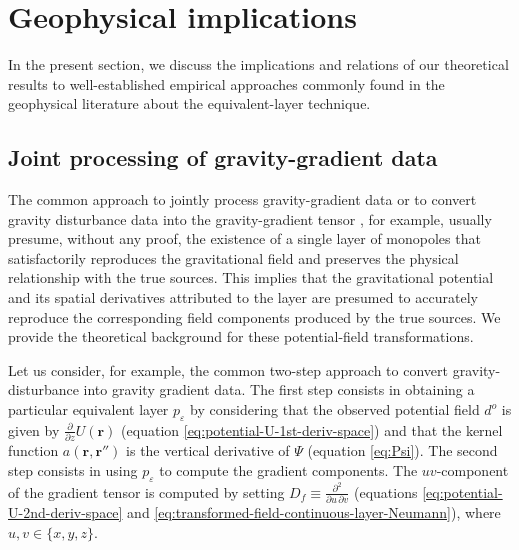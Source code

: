 \section{Geophysical implications}

In the present section, we discuss the implications and relations of our 
theoretical results to well-established empirical approaches commonly found 
in the geophysical literature about the equivalent-layer technique.

\subsection{Joint processing of gravity-gradient data}

The common approach to jointly process gravity-gradient data 
\cite[e.g.,][]{boggs-dransfield2004,barnes_lumley2011, martinez_li_2016} or to convert gravity disturbance data into the 
gravity-gradient tensor \cite[e.g.,][]{piauilino_etal2019_seg, oliveirajr_etal2023}, for example, 
usually presume, without any proof, the existence of a single layer of 
monopoles that satisfactorily reproduces the gravitational field and
preserves the physical relationship with the true sources.
This implies that the gravitational potential and its spatial derivatives attributed to the layer are presumed to 
accurately reproduce the corresponding field components produced by the true sources.
We provide the theoretical background for these potential-field transformations.

Let us consider, for example, the common two-step approach to convert gravity-disturbance into gravity
gradient data. The first step consists in obtaining a particular equivalent layer $p_{\varepsilon}$ 
by considering that the observed potential field $d^{o}$ is given by $\tfrac{\partial}{\partial z} U(\mathbf{r})$ 
(equation \ref{eq:potential-U-1st-deriv-space}) and that the kernel function 
$a(\mathbf{r}, \mathbf{r}'')$ is the vertical derivative of $\Psi$ (equation \ref{eq:Psi}).
The second step consists in using $p_{\varepsilon}$ to compute the gradient components.
The $uv$-component of the gradient tensor is computed by setting $D_{f} \equiv \tfrac{\partial^{2}}{\partial u \, \partial v}$
(equations \ref{eq:potential-U-2nd-deriv-space} and \ref{eq:transformed-field-continuous-layer-Neumann}),
where $u, v \in \{ x, y, z \}$.

